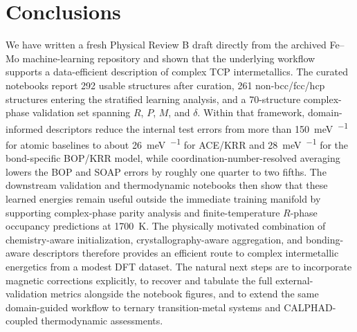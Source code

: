 \section{Conclusions}
\label{sec:conclusions}

We have written a fresh Physical Review B draft directly from the archived Fe--Mo machine-learning repository and shown that the underlying workflow supports a data-efficient description of complex TCP intermetallics. The curated notebooks report 292 usable structures after curation, 261 non-bcc/fcc/hcp structures entering the stratified learning analysis, and a 70-structure complex-phase validation set spanning $R$, $P$, $M$, and $\delta$. Within that framework, domain-informed descriptors reduce the internal test errors from more than \SI{150}{\milli\electronvolt\per\atom} for atomic baselines to about \SI{26}{\milli\electronvolt\per\atom} for ACE/KRR and \SI{28}{\milli\electronvolt\per\atom} for the bond-specific BOP/KRR model, while coordination-number-resolved averaging lowers the BOP and SOAP errors by roughly one quarter to two fifths. The downstream validation and thermodynamic notebooks then show that these learned energies remain useful outside the immediate training manifold by supporting complex-phase parity analysis and finite-temperature $R$-phase occupancy predictions at \SI{1700}{\kelvin}. The physically motivated combination of chemistry-aware initialization, crystallography-aware aggregation, and bonding-aware descriptors therefore provides an efficient route to complex intermetallic energetics from a modest DFT dataset. The natural next steps are to incorporate magnetic corrections explicitly, to recover and tabulate the full external-validation metrics alongside the notebook figures, and to extend the same domain-guided workflow to ternary transition-metal systems and CALPHAD-coupled thermodynamic assessments.
